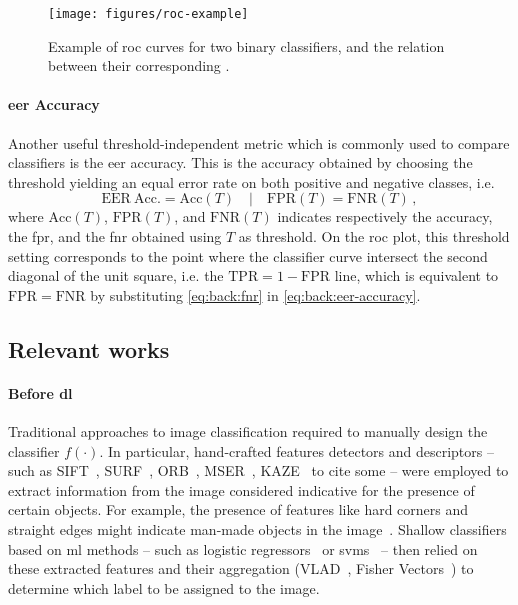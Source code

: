\begin{figure}
    \centering
    \texttt{[image: figures/roc-example]}
    \caption{Example of \acrfull{roc} curves for two binary classifiers, and the relation between their corresponding . }
    \label{fig:back:roc}
\end{figure}

\paragraph{\acrshort{eer} Accuracy}
Another useful threshold-independent metric which is commonly used to compare classifiers is the \gls{eer} accuracy.
This is the accuracy obtained by choosing the threshold yielding an equal error rate on both positive and negative classes, i.e.
\begin{equation} \label{eq:back:eer-accuracy}
    \mathrm{EER\ Acc.} = \mathrm{Acc}(T) \quad | \quad \mathrm{FPR}(T) = \mathrm{FNR}(T) \,,
\end{equation}
where $\mathrm{Acc}(T)$, $\mathrm{FPR}(T)$, and $\mathrm{FNR}(T)$ indicates respectively the accuracy, the \gls{fpr}, and the \gls{fnr} obtained using $T$ as threshold.
On the \gls{roc} plot, this threshold setting corresponds to the point where the classifier curve intersect the second diagonal of the unit square, i.e. the $\mathrm{TPR} = 1 - \mathrm{FPR}$ line, which is equivalent to $\mathrm{FPR} = \mathrm{FNR}$ by substituting \ref{eq:back:fnr} in \ref{eq:back:eer-accuracy}.

\subsection{Relevant works}
\label{subsec:back:classif-relwork}

\paragraph{Before \acrlong{dl}}
Traditional approaches to image classification required to manually design the classifier $f(\cdot)$.
In particular, hand-crafted features detectors and descriptors -- such as SIFT~\cite{lowe2004distinctive}, SURF~\cite{bay2006surf}, ORB~\cite{rublee2011orb}, MSER~\cite{matas2004robust}, KAZE~\cite{alcantarilla2012kaze} to cite some -- were employed to extract information from the image considered indicative for the presence of certain objects.
For example, the presence of features like hard corners and straight edges might indicate man-made objects in the image~\cite{piccinini2012real}.
Shallow classifiers based on \gls{ml} methods -- such as logistic regressors~\cite{mensink2012metric} or \glspl{svm}~\cite{arandjelovic2012three} -- then relied on these extracted features and their aggregation (VLAD~\cite{jegou2010aggregating}, Fisher Vectors~\cite{perronnin2010improving}) to determine which label to be assigned to the image.

